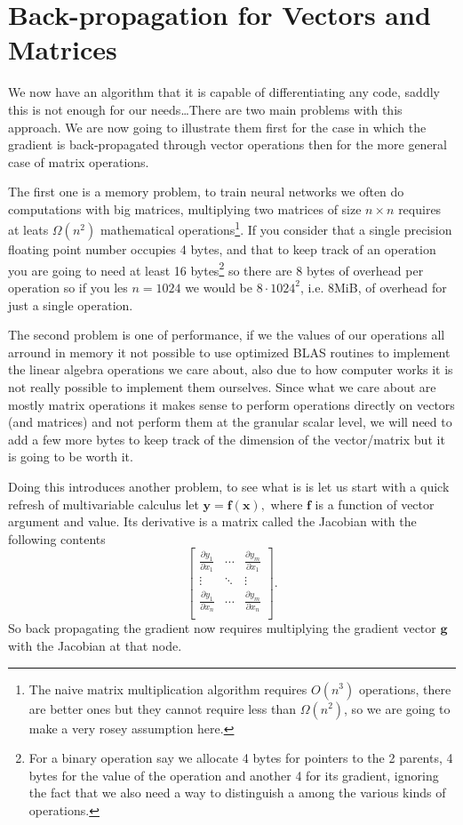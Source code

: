 \documentclass{article}
\newcommand{\partialfrac}[2]{\frac{\partial #1}{\partial #2}}
\renewcommand\vec[1]{\mathbf{#1}}
\begin{document}
\section{Back-propagation for Vectors and Matrices}

We now have an algorithm that it is capable of differentiating any code, saddly
this is not enough for our needs\dots There are two main problems with this
approach. We are now going to illustrate them first for the case in which the
gradient is back-propagated through vector operations then for the more general
case of matrix operations.

The first one is a memory problem, to train neural networks we often
do computations with big matrices, multiplying two matrices of size \(n \times
n\) requires at leats \(\Omega(n^2)\) mathematical operations\footnote{The
naive matrix multiplication algorithm requires \(O(n^3)\) operations, there are
better ones but they cannot require less than \(\Omega(n^2)\), so we are going
to make a very rosey assumption here.}. If you consider that a single precision
floating point number occupies 4 bytes, and that to keep track of an operation
you are going to need at least 16 bytes\footnote{For a binary operation say we
allocate 4 bytes for pointers to the 2 parents, 4 bytes for the value of the
operation and another 4 for its gradient, ignoring the fact that we also need a
way to distinguish a among the various kinds of operations.} so there are 8
bytes of overhead per
operation so if you les \(n=1024\) we would be \(8 \cdot 1024^2\), i.e. 8MiB,
of overhead for just a single operation.

The second problem is one of performance, if we the values of our operations
all arround in memory it not possible to use optimized BLAS routines to
implement the linear algebra operations we care about, also due to how computer
works it is not really possible to implement them ourselves. Since what we care
about are mostly matrix operations it makes sense to perform operations
directly on vectors (and matrices) and not perform them at the granular scalar
level, we will need to add a few more bytes to keep track of the dimension of
the vector/matrix but it is going to be worth it.

Doing this introduces another problem, to see what is is let us start with a
quick refresh of multivariable calculus let \(\vec y = \vec f(\vec x),\) where
\(\vec f\) is a function of vector argument and value. Its derivative is a
matrix called the Jacobian with the following contents \[
\left[\begin{array}{ccc}
\partialfrac{y_1}{x_1} & \cdots & \partialfrac{y_m}{x_1} \\
\vdots & \ddots & \vdots \\
\partialfrac{y_1}{x_n} & \cdots & \partialfrac{y_m}{x_n} \\
\end{array}\right]\!.
\] So back propagating the gradient now requires multiplying the gradient
vector \(\vec g\) with the Jacobian at that node.
\end{document}
